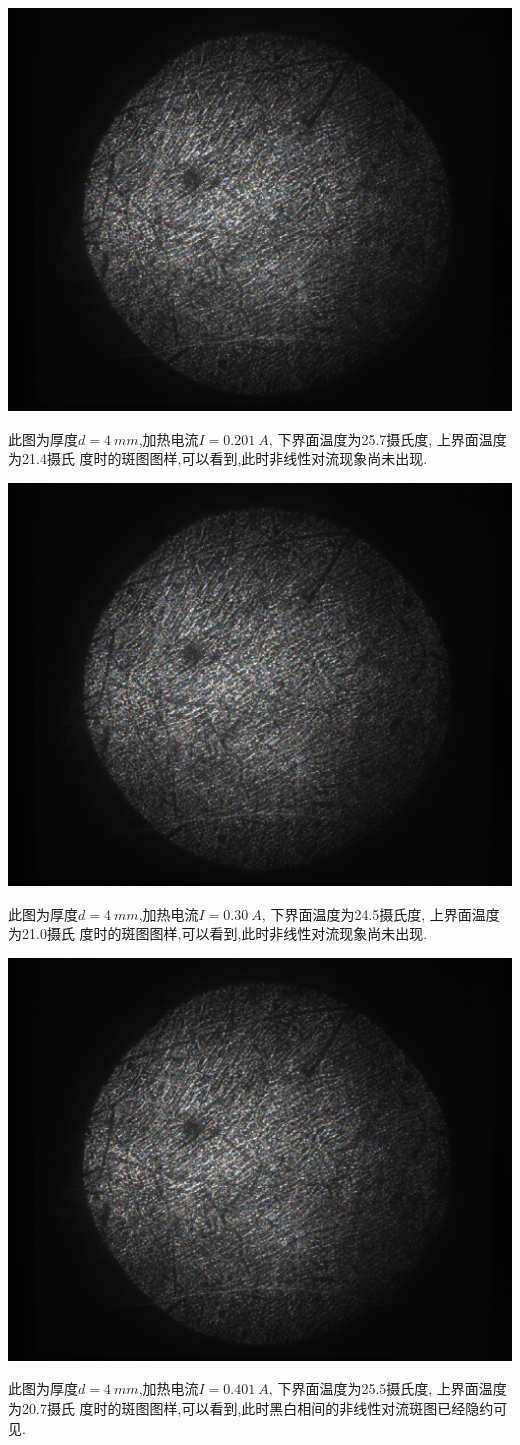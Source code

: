 \documentclass[aps,pre,12pt,preprint,onecolumn,showpacs,showkeys,floatfix]{revtex4-1}
\begin{document}
\begin{center}
    \includegraphics[width=.5\textwidth]{5.20/9.pdf}
\end{center}
    此图为厚度$d=\SI{4}{mm}$,加热电流$I=\SI{0.201}{A}$, 下界面温度为25.7摄氏度,
    上界面温度为21.4摄氏
    度时的斑图图样,可以看到,此时非线性对流现象尚未出现.

\begin{center}
    \includegraphics[width=.5\textwidth]{5.20/10.pdf}
\end{center}
    此图为厚度$d=\SI{4}{mm}$,加热电流$I=\SI{0.30}{A}$, 下界面温度为24.5摄氏度,
    上界面温度为21.0摄氏
    度时的斑图图样,可以看到,此时非线性对流现象尚未出现.

\begin{center}
    \includegraphics[width=.5\textwidth]{5.20/11.pdf}
\end{center}
    此图为厚度$d=\SI{4}{mm}$,加热电流$I=\SI{0.401}{A}$, 下界面温度为25.5摄氏度,
    上界面温度为20.7摄氏
    度时的斑图图样,可以看到,此时黑白相间的非线性对流斑图已经隐约可见.
\end{document}
